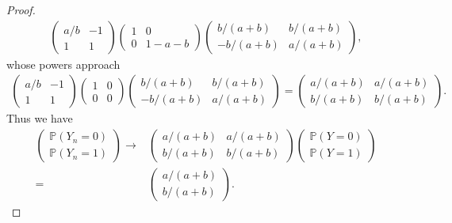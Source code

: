 \documentclass[10pt,a4paper]{amsart}
\renewcommand{\P}{\mathbb P}
\begin{document}
\begin{proof}
\begin{align}
\begin{pmatrix}
            a/b & -1\\
            1 & 1
        \end{pmatrix}
        \begin{pmatrix}
            1 & 0\\
            0 & 1-a-b
        \end{pmatrix}
        \begin{pmatrix}
            b/(a+b) & b/(a+b)\\
            -b/(a+b) & a/(a+b)
        \end{pmatrix},
\end{align}
whose powers approach
\begin{align}
    \begin{pmatrix}
            a/b & -1\\
            1 & 1
        \end{pmatrix}
        \begin{pmatrix}
            1 & 0\\
            0 & 0
        \end{pmatrix}
        \begin{pmatrix}
            b/(a+b) & b/(a+b)\\
            -b/(a+b) & a/(a+b)
        \end{pmatrix}
        =\begin{pmatrix}
            a/(a+b) & a/(a+b)\\
            b/(a+b) & b/(a+b)
        \end{pmatrix}.
\end{align}
Thus we have
\begin{align}
     \begin{pmatrix}
            \P(Y_{n}=0)\\
            \P(Y_{n}=1)
        \end{pmatrix}\to&
        \begin{pmatrix}
            a/(a+b) & a/(a+b)\\
            b/(a+b) & b/(a+b)
        \end{pmatrix}
        \begin{pmatrix}
            \P(Y=0)\\
            \P(Y=1)
        \end{pmatrix}\\
        =&\begin{pmatrix}
            a/(a+b)\\
            b/(a+b)
        \end{pmatrix}.
\end{align}
\end{proof}
\end{document}

